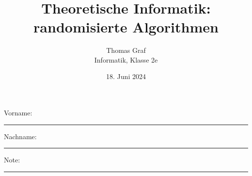 
\newtoggle{withbonus}  %

\newcommand{\mycourse}{Informatik}
\newcommand{\myclass}{Klasse 2e}
\newcommand{\mydate}{18. Juni 2024}

\title{\textbf{Theoretische Informatik: randomisierte Algorithmen}}
\author{Thomas Graf\\
\mycourse, \myclass}
\date{\mydate}
\maketitle
\thispagestyle{headandfoot}		

\begin{center}
\end{center}
\vspace{10mm}

\begin{center}
	Vorname: \rule{45mm}{0.8pt}\qquad Nachname: \rule{45mm}{0.8pt}
\end{center}
\vspace{20mm}

\begin{center}
	\iftoggle{withbonus} {
		\combinedgradetable[h][questions]
	} {
		\gradetable[h][questions]
	}
\end{center}
\vspace{15mm}
\begin{center}
	Note: 
	\vspace{10mm}
	
	\rule{8mm}{1.2pt}
\end{center}
\clearpage


